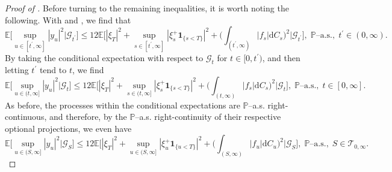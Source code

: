 \documentclass[10pt]{article} %
\newcommand\cG{\mathcal G}
\newcommand\cT{\mathcal T}
\def \E{\mathbb{E}}
\def \P{\mathbb{P}}
\newcommand{\1}{\mathbf{1}}
\def\d{\mathrm{d}}
\begin{document}
\begin{proof}[Proof of ]
\medskip
Before turning to the remaining inequalities, it is worth noting the following. With  and , we find that
\begin{equation*}
	\E\bigg[\sup_{u \in [t^\prime,\infty]}|y_u|^2 \bigg| \cG_{t^\prime}\bigg] \leq 12 \E\bigg[|\xi_T|^2 + \sup_{s \in [t^\prime,\infty]}|\xi^+_s\mathbf{1}_{\{s<T\}}|^2 + \bigg(\int_{(t^\prime,\infty)} |f_s| \d C_s\bigg)^2 \bigg| \cG_{t^\prime} \bigg], \; \text{$\P$--a.s.}, \; t^\prime \in (0,\infty).
\end{equation*}
By taking the conditional expectation with respect to $\cG_t$ for $t \in [0,t^\prime)$, and then letting $t^\prime$ tend to $t$, we find
\begin{equation*}\label{eq::conditional_sup_y1}
	\E\bigg[\sup_{u \in (t,\infty]}|y_u|^2 \bigg| \cG_t\bigg] \leq 12 \E\bigg[|\xi_T|^2 + \sup_{s \in (t,\infty]}|\xi^+_s\mathbf{1}_{\{s<T\}}|^2 + \bigg(\int_{(t,\infty)} |f_s| \d C_s\bigg)^2 \bigg| \cG_t \bigg], \; \text{$\P$--a.s.}, \; t \in [0,\infty].
\end{equation*}
As before, the processes within the conditional expectations are $\P$--a.s. right-continuous, and therefore, by the $\P$--a.s. right-continuity of their respective optional projections, we even have
\begin{equation}\label{eq::ineq_sup_y_cond}
	\E\bigg[\sup_{u \in (S,\infty]}|y_u|^2 \bigg| \cG_S\bigg] \leq 12 \E\bigg[|\xi_T|^2 + \sup_{u \in (S,\infty]}|\xi^+_u\mathbf{1}_{\{u<T\}}|^2 + \bigg(\int_{(S,\infty)} |f_u| \d C_u\bigg)^2 \bigg| \cG_S \bigg], \; \text{$\P$--a.s.}, \; S \in \cT_{0,\infty}.
\end{equation}


\end{proof}
\end{document}
